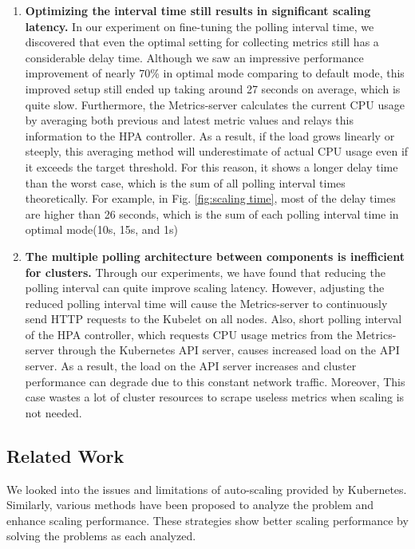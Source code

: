 \documentclass[conference]{IEEEtran}
\begin{document}
\begin{enumerate}
    \item \textbf{Optimizing the interval time still results in significant scaling latency.} In our experiment on fine-tuning the polling interval time, we discovered that even the optimal setting for collecting metrics still has a considerable delay time. Although we saw an impressive performance improvement of nearly 70\% in optimal mode comparing to default mode, this improved setup still ended up taking around 27 seconds on average, which is quite slow. Furthermore, the Metrics-server calculates the current CPU usage by averaging both previous and latest metric values and relays this information to the HPA controller. As a result, if the load grows linearly or steeply, this averaging method will underestimate of actual CPU usage even if it exceeds the target threshold. For this reason, it shows a longer delay time than the worst case, which is the sum of all polling interval times theoretically. For example, in Fig. \ref{fig:scaling time}, most of the delay times are higher than 26 seconds, which is the sum of each polling interval time in optimal mode(10s, 15s, and 1s)

    \item \textbf{The multiple polling architecture between components is inefficient for clusters.} Through our experiments, we have found that reducing the polling interval can quite improve scaling latency. However, adjusting the reduced polling interval time will cause the Metrics-server to continuously send HTTP requests to the Kubelet on all nodes. Also, short polling interval of the HPA controller, which requests CPU usage metrics from the Metrics-server through the Kubernetes API server, causes increased load on the API server. As a result, the load on the API server increases and cluster performance can degrade due to this constant network traffic\cite{ExpediaGroupTech2020}. Moreover, This case wastes a lot of cluster resources to scrape useless metrics when scaling is not needed.
\end{enumerate}


\subsection{Related Work}
We looked into the issues and limitations of auto-scaling provided by Kubernetes.  Similarly, various methods have been proposed to analyze the problem and enhance scaling performance. These strategies show better scaling performance by solving the problems as each analyzed.
\end{document}

